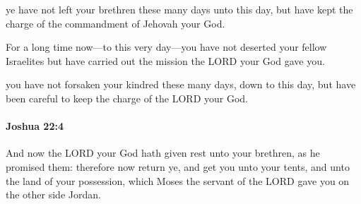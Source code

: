 			\begin{versebox}
					\item[BHS] 
					\item[ASV] ye have not left your brethren these many days unto this day, but have kept the charge of the commandment of Jehovah your God.
					\item[NIV] For a long time now—to this very day—you have not deserted your fellow Israelites but have carried out the mission the LORD your God gave you.
					\item[NRSV] you have not forsaken your kindred these many days, down to this day, but have been careful to keep the charge of the LORD your God.
			\end{versebox}

		\paragraph{Joshua 22:4} %
			\label{JOSHUA-22-4}

			And now the LORD your God hath given rest unto your brethren, as he promised them: therefore now return ye, and get you unto your tents, and unto the land of your possession, which Moses the servant of the LORD gave you on the other side Jordan.

